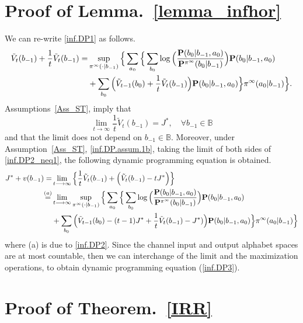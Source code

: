 \documentclass[11pt, a4paper, journal,onecolumn]{IEEEtran}
\newcommand{\mb}{\mathbb}
\begin{document}
\section{Proof of Lemma.~\ref{lemma_infhor}}\label{lemma_infhor_proof}
We can re-write \eqref{inf.DP1} as follows. 
\begin{align}
\tilde{V}_t(b_{-1})+\frac{1}{t}\tilde{V}_t(b_{-1})=&\sup_{\pi^{\infty}(\cdot|b_{-1})}\Big\{\sum_{a_0}\Big\{\sum_{b_0}\log\Big(\frac{{\bf P}(b_0|b_{-1},a_0)}{{\bf P}^{\pi^{\infty}}(b_0|b_{-1})}\Big){\bf P}(b_0|b_{-1},a_0)\label{inf.DP2}\\
&+\sum_{b_0}\Big(\tilde{V}_{t-1}(b_0)+\frac{1}{t}\tilde{V}_t(b_{-1})\Big){\bf P}(b_0|b_{-1},a_0)\Big\}\pi^{\infty}(a_0|b_{-1})\Big\}.\label{inf.DP2_neq1}
\end{align}
Assumptions~\ref{Ass_ST},  imply that 
\begin{equation}
\lim_{t\longrightarrow\infty}\frac{1}{t}\tilde{V}_t(b_{-1})=J^*,\quad \forall b_{-1}\in \mathbb{B} \label{inf.DP.assum.1b}
\end{equation}
and that the limit does not depend on $b_{-1}\in {\mb B}$. Moreover, under Assumption~\ref{Ass_ST}, \eqref{inf.DP.assum.1b}, taking the limit of both sides of \eqref{inf.DP2_neq1}, the following dynamic programming equation is obtained. 
\begin{align}
J^*+v(b_{-1})=&\lim_{t\longrightarrow\infty}\Big\{\frac{1}{t}\tilde{V}_t(b_{-1})+\Big(\tilde{V}_t(b_{-1})-tJ^*\Big)\Big\}\\
\overset{(a)}=&\lim_{t\longrightarrow\infty}\sup_{\pi^{\infty}(\cdot|b_{-1})}\Big\{\sum_{a_0}\Big\{\sum_{b_0}\log\Big(\frac{{\bf P}(b_0|b_{-1},a_0)}{{\bf P}^{\pi^{\infty}}(b_0|b_{-1})}\Big){\bf P}(b_0|b_{-1},a_0)\\
&+\sum_{b_0}\Big(\tilde{V}_{t-1}(b_0)-(t-1)J^*+\frac{1}{t}\tilde{V}_t(b_{-1})-J^*)\Big){\bf P}(b_0|b_{-1},a_0)\Big\}\pi^{\infty}(a_0|b_{-1})\Big\} \label{der_IH}
\end{align}
where (a) is due to  \eqref{inf.DP2}.
Since the  channel input and output alphabet spaces are at most countable,  then we can interchange of the limit and the maximization operations, to obtain  dynamic programming equation (\ref{inf.DP3}).




\section{Proof of Theorem.~\ref{IRR}}\label{IRR_proof}
\end{document}
